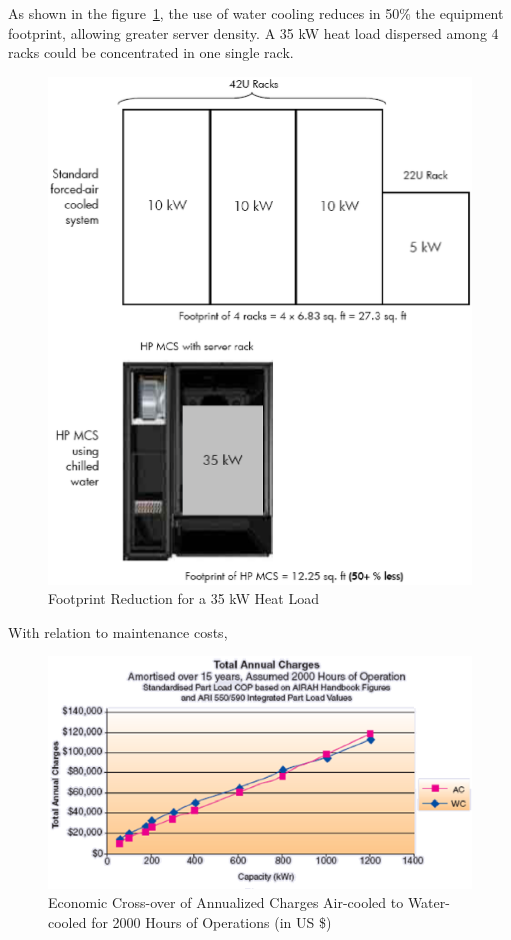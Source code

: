                 As shown in the figure~\ref{fig:footprint_reduction_for_35_heat_load}, the use of water cooling reduces in 50\% the equipment footprint, allowing greater server density. A 35 kW heat load dispersed among 4 racks could be concentrated in one single rack.
                
                \begin{figure}[h!tb]
                    \centering
                    \includegraphics[scale=0.5]{graphics/footprint_reduction_for_35_heat_load}
                    \caption{Footprint Reduction for a 35 kW Heat Load}
                    \label{fig:footprint_reduction_for_35_heat_load}
                \end{figure}
                With relation to maintenance costs,
                \begin{figure}[h!tb]
                    \centering
                    \includegraphics[scale=0.8]{graphics/economic_crossover_annualized}
                    \caption{Economic Cross-over of Annualized Charges Air-cooled to Water-cooled for 2000 Hours of Operations (in US \$)}
                    \label{fig:economic_crossover_annualized}
                \end{figure}
